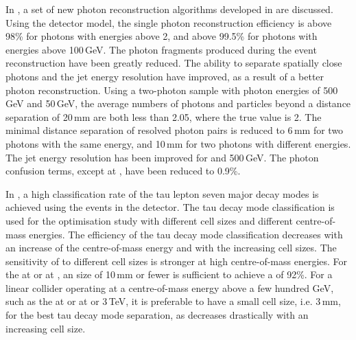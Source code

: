  In , a set of new photon reconstruction algorithms developed in \pandora are discussed. Using the \ILD detector model, the single photon reconstruction efficiency is above 98\% for photons with energies above 2\GeV, and above 99.5\% for photons with energies above 100\,GeV. The photon fragments produced during the event reconstruction have been greatly reduced. The ability to separate spatially close photons and the jet energy resolution have improved, as a result of a better photon reconstruction. Using a two-photon sample with photon energies of  500\,GeV and 50\,GeV, the average numbers of photons and particles beyond a distance separation of 20\,mm  are both less than 2.05, where the true value is 2. The minimal distance separation of  resolved photon pairs is reduced to 6\,mm for two photons with the same energy, and 10\,mm for two photons with different energies. The jet energy resolution has been improved for  and 500\,GeV. The photon confusion terms, except at , have been reduced to 0.9\%.



In , a high classification rate of the tau lepton seven major decay modes is achieved using the \eeTauTau events in the \ILD detector. The tau decay mode classification is used for the \ECAL optimisation study with different \ECAL cell sizes and different centre-of-mass energies. The efficiency of the tau decay mode classification  decreases with an increase of the centre-of-mass energy and with the  increasing \ECAL cell sizes. The sensitivity of \tauHad to different cell sizes is stronger at high centre-of-mass energies.  For the \ILC at  or \CLIC at , an \ECAL size of 10\,mm or fewer is sufficient to achieve a \tauHad of 92\%. For a linear collider operating at a centre-of-mass energy above a few hundred GeV, such as the \ILC at  or \CLIC at  or 3\,TeV, it is preferable to have a small \ECAL cell size, i.e. 3\,mm,  for the best tau decay mode separation, as \tauHad decreases drastically with an increasing \ECAL cell size.

